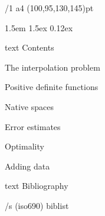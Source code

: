 \useOpTeX  %


\hyperlinks \Black \Black
{}


\enlang
\fontfam[BaskervilleMT]\load[patches]\let\semibold\bf %
{}%

\def\QED{\Umathchar"0"01"00203B}

\margins/1 a4 (100,95,130,145)pt

\typosize[11.9/14.1]
\parindent 1.5em
\parskip 1.5ex
 0.12ex

\bgroup
\let\_mtext\ignoreit
\nonum\notoc\chap Contents
\egroup
\tocpage


\sec The interpolation problem


\sec Positive definite functions


\sec Native spaces


\sec[errorsec] Error estimates


\sec Optimality


\sec[addingsec] Adding data







\bgroup
\let\_mtext\ignoreit
\nonum\chap Bibliography

\def\_opwarning#1{}
\usebib/s (iso690) biblist
\egroup

\bye
